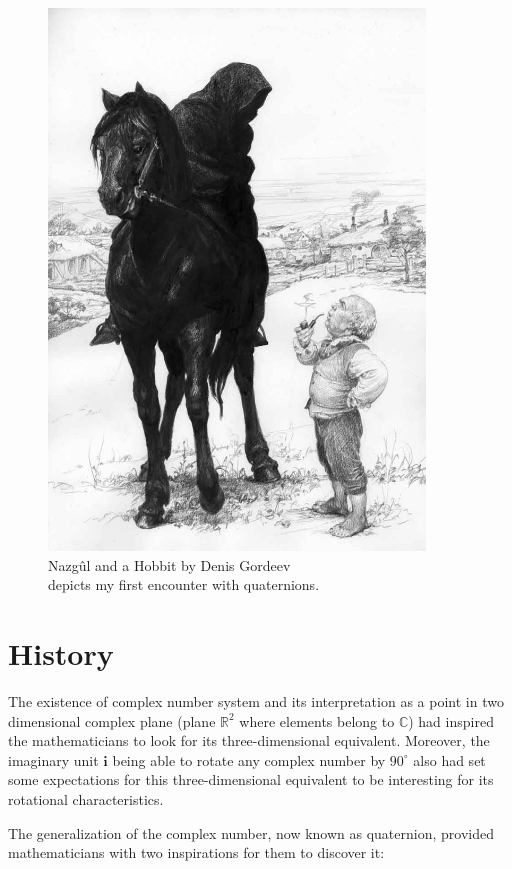 \documentclass[12pt]{article}
\begin{document}
\newpage
~\vfill
\begin{figure}[hbt!]
    \begin{center}
        \includegraphics[width = 10cm]{figs/fig_denis_gordeev.jpg}
        \caption*{Nazgûl and a Hobbit by Denis Gordeev\\ depicts my first encounter with quaternions.}
    \end{center}
\end{figure}
\vfill

\newpage
\section{History}
The existence of complex number system and its interpretation as a point in two dimensional complex plane (plane $\mathbb{R}^{2}$ where elements belong to $\mathbb{C}$) had inspired the mathematicians to look for its three-dimensional equivalent. Moreover, the imaginary unit $\bm{i}$ being able to rotate any complex number by $90^\circ$ also had set some expectations for this three-dimensional equivalent to be interesting for its rotational characteristics. 

The generalization of the complex number, now known as quaternion, provided mathematicians with two inspirations for them to discover it:
\end{document}
